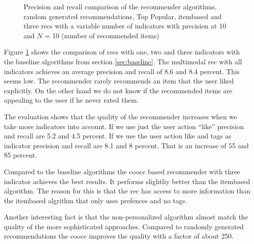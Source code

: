 \pgfplotsset{width=7cm}
\begin{figure}
  \centering
{} 
\caption{Precision and recall comparison of the recommender algorithms, random generated recommendations, Top Popular, itembased  and three \glspl{rec} with a variable number of indicators with precision at 10 and $N$ = 10 (number of recommended items)}
  \label{fig:precisionrecallvalues}
\end{figure}

Figure \ref{fig:precisionrecallvalues} shows the comparison of \glspl{rec} with one, two and three indicators with the baseline algorithms from section \ref{sec:baseline}.
The multimodal \gls{rec} with all indicators achieves an average precision and recall of 8.6 and 8.4 percent. This seems low. The recommender rarely recommends an item that the user liked explicitly. On the other hand we do not know if the recommended items are appealing to the user if he never rated them.

The evaluation shows that the quality of the recommender increases when we take more indicators into account. If we use just the user action ``like'' precision and recall are 5.2 and 4.5 percent. If we use the user action like and \glspl{tag} as indicator precision and recall are  8.1 and 8 percent. That is an increase of 55 and 85 percent.

Compared to the baseline algorithms the \gls{coocc} based recommender with three indicator achieves the best results. It performs slightliy better than the \gls{itembased} algorithm. The reason for this is that the \gls{rec} has access to more information than the \gls{itembased} algrithm that only uses prefences and no tags.

Another interesting fact is that the non-personalized algorithm almost match the quality of the more sophisticated approaches. Compared to randomly generated recommendations the \gls{coocc} improves the quality with a factor of about 250.
